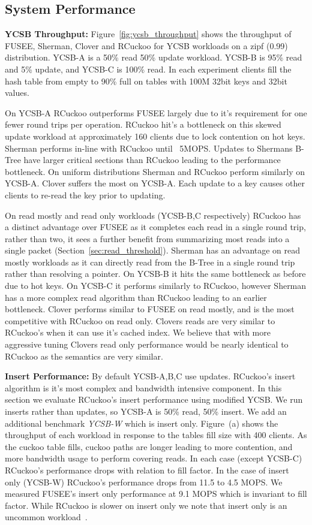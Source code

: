 \subsection{System Performance}

\textbf{YCSB Throughput:} Figure~\ref{fig:ycsb_throughput} shows
the throughput of FUSEE, Sherman, Clover and RCuckoo for
YCSB workloads on a zipf (0.99) distribution. YCSB-A is a
50\% read 50\% update workload.  YCSB-B is 95\% read and 5\%
update, and YCSB-C is 100\% read.  In each experiment
clients fill the hash table from empty to 90\% full on
tables with 100M 32bit keys and 32bit values.

On YCSB-A RCuckoo outperforms FUSEE largely due to it's
requirement for one fewer round trips per operation. RCuckoo
hit's a bottleneck on this skewed update workload at
approximately 160 clients due to lock contention on hot
keys. Sherman performs in-line with RCuckoo until ~5MOPS.
Updates to Shermans B-Tree have larger critical sections
than RCuckoo leading to the performance bottleneck. On
uniform distributions Sherman and RCuckoo perform similarly
on YCSB-A. Clover suffers the most on YCSB-A. Each update to
a key causes other clients to re-read the key prior to
updating.

On read mostly and read only workloads (YCSB-B,C
respectively) RCuckoo has a distinct advantage over FUSEE as
it completes each read in a single round trip, rather than
two, it sees a further benefit from summarizing most reads
into a single packet (Section~\ref{sec:read_threshold}).
Sherman has an advantage on read mostly workloads as it can
directly read from the B-Tree in a single round trip rather
than resolving a pointer. On YCSB-B it hits the same
bottleneck as before due to hot keys. On YCSB-C it performs
similarly to RCuckoo, however Sherman has a more complex
read algorithm than RCuckoo leading to an earlier
bottleneck. Clover performs similar to FUSEE on read mostly,
and is the most competitive with RCuckoo on read only.
Clovers reads are very similar to RCuckoo's when it can use
it's cached index. We believe that with more aggressive
tuning Clovers read only performance would be nearly
identical to RCuckoo as the semantics are very similar.


\textbf{Insert Performance:}
By default YCSB-A,B,C use updates. RCuckoo's insert
algorithm is it's most complex and bandwidth intensive
component. In this section we evaluate RCuckoo's insert
performance using modified YCSB. We run inserts rather than
updates, so YCSB-A is 50\% read, 50\% insert. We add an
additional benchmark \textit{YCSB-W} which is insert only.
Figure~\cite{fig:ycsb_fill}(a) shows the throughput
of each workload in response to the tables fill size with
400 clients. As the cuckoo table fills, cuckoo paths are
longer leading to more contention, and more bandwidth usage
to perform covering reads. In each case (except YCSB-C)
RCuckoo's performance drops with relation to fill factor. In
the case of insert only (YCSB-W) RCuckoo's performance drops
from 11.5 to 4.5 MOPS. We measured FUSEE's insert only
performance at 9.1 MOPS which is invariant to fill factor.
While RCuckoo is slower on insert only we note that insert
only is an uncommon workload~\cite{facebook-memcached}.

